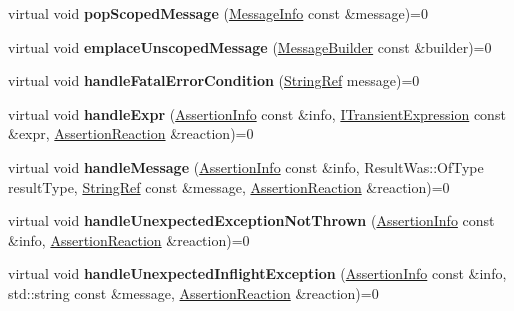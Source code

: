 \begin{DoxyCompactItemize}
virtual void {\bfseries pop\+Scoped\+Message} (\hyperlink{structCatch_1_1MessageInfo}{Message\+Info} const \&message)=0
\item 
\mbox{\label{structCatch_1_1IResultCapture_a49f74f1323ef8be71b8f9b8e8b2c0fc2}} 
virtual void {\bfseries emplace\+Unscoped\+Message} (\hyperlink{structCatch_1_1MessageBuilder}{Message\+Builder} const \&builder)=0
\item 
\mbox{\label{structCatch_1_1IResultCapture_a48559e6598ba9474b903697b69c769b2}} 
virtual void {\bfseries handle\+Fatal\+Error\+Condition} (\hyperlink{classCatch_1_1StringRef}{String\+Ref} message)=0
\item 
\mbox{\label{structCatch_1_1IResultCapture_a59a2b05391e464954575d2afb6d5d607}} 
virtual void {\bfseries handle\+Expr} (\hyperlink{structCatch_1_1AssertionInfo}{Assertion\+Info} const \&info, \hyperlink{structCatch_1_1ITransientExpression}{I\+Transient\+Expression} const \&expr, \hyperlink{structCatch_1_1AssertionReaction}{Assertion\+Reaction} \&reaction)=0
\item 
\mbox{\label{structCatch_1_1IResultCapture_a21788ebc64571abf322b80c8cc51794d}} 
virtual void {\bfseries handle\+Message} (\hyperlink{structCatch_1_1AssertionInfo}{Assertion\+Info} const \&info, Result\+Was\+::\+Of\+Type result\+Type, \hyperlink{classCatch_1_1StringRef}{String\+Ref} const \&message, \hyperlink{structCatch_1_1AssertionReaction}{Assertion\+Reaction} \&reaction)=0
\item 
\mbox{\label{structCatch_1_1IResultCapture_a6382ed20486e2d9a020da971c6d5c53d}} 
virtual void {\bfseries handle\+Unexpected\+Exception\+Not\+Thrown} (\hyperlink{structCatch_1_1AssertionInfo}{Assertion\+Info} const \&info, \hyperlink{structCatch_1_1AssertionReaction}{Assertion\+Reaction} \&reaction)=0
\item 
\mbox{\label{structCatch_1_1IResultCapture_afc97bc69829185222f955ebeef97adfe}} 
virtual void {\bfseries handle\+Unexpected\+Inflight\+Exception} (\hyperlink{structCatch_1_1AssertionInfo}{Assertion\+Info} const \&info, std\+::string const \&message, \hyperlink{structCatch_1_1AssertionReaction}{Assertion\+Reaction} \&reaction)=0

\end{DoxyCompactItemize}
